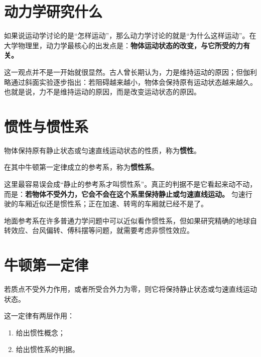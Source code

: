\documentclass[lang=cn,11pt]{elegantbook}
\begin{document}
\section{动力学研究什么}

如果说运动学讨论的是“怎样运动”，那么动力学讨论的就是“为什么这样运动”。在大学物理里，动力学最核心的出发点是：\textbf{物体运动状态的改变，与它所受的力有关。}

这一观点并不是一开始就很显然。古人曾长期认为，力是维持运动的原因；但伽利略通过斜面实验逐步指出：若阻碍越来越小，物体会保持原有运动状态越来越久。也就是说，力不是维持运动的原因，而是改变运动状态的原因。

\section{惯性与惯性系}

\begin{definition}[惯性]\label{def:inertia}
物体保持原有静止状态或匀速直线运动状态的性质，称为\textbf{惯性}。
\end{definition}

\begin{definition}[惯性参考系]\label{def:inertial-frame}
在其中牛顿第一定律成立的参考系，称为\textbf{惯性系}。
\end{definition}

\begin{note}
这里最容易误会成“静止的参考系才叫惯性系”。真正的判据不是它看起来动不动，而是：\textbf{若物体不受外力，它会不会在这个系里保持静止或匀速直线运动。} 匀速行驶的车厢近似还是惯性系；正在加速、转弯的车厢就已经不是了。
\end{note}

地面参考系在许多普通力学问题中可以近似看作惯性系，但如果研究精确的地球自转效应、台风偏转、傅科摆等问题，就需要考虑非惯性效应。

\section{牛顿第一定律}

\begin{theorem}[牛顿第一定律]\label{thm:newton-first}
若质点不受外力作用，或者所受合外力为零，则它将保持静止状态或匀速直线运动状态。
\end{theorem}

这一定律有两层作用：
\begin{enumerate}
  \item 给出惯性概念；
  \item 给出惯性系的判据。
\end{enumerate}
\end{document}

